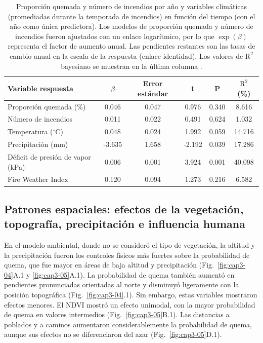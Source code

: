 \begin{table}[ht]
\centering
\caption[Tendencias temporales en incidencia del fuego y variables climáticas.]{Proporción quemada y número de incendios por año y variables climáticas (promediadas durante la temporada de incendios) en función del tiempo (con el año como única predictora). Los modelos de proporción quemada y número de incendios fueron ajustados con un enlace logarítmico, por lo que $\exp{(\beta)}$ representa el factor de aumento anual. Las pendientes restantes son las tasas de cambio anual en la escala de la respuesta (enlace identidad). Los valores de $\text{R}^2$ bayesiano se muestran en la última columna \citep{gelman_r-squared_2019}.}
\label{tab:climate-ts}
\begin{tabular}{lccccc}
\toprule
Variable respuesta & $\beta$ & Error estándar & t & P & $\text{R}^2$ (\%) \\
\midrule
Proporción quemada (\%)           & 0.046   & 0.047 & 0.976  & 0.340 & 8.616  \\
Número de incendios               & 0.011   & 0.022 & 0.491  & 0.624 & 1.032  \\
Temperatura ($^\circ$C)           & 0.048   & 0.024 & 1.992  & 0.059 & 14.716 \\
Precipitación (mm)                & -3.635  & 1.658 & -2.192 & 0.039 & 17.286 \\
Déficit de presión de vapor (kPa) & 0.006   & 0.001 & 3.924  & 0.001 & 40.098 \\
Fire Weather Index                & 0.120   & 0.094 & 1.273  & 0.216 & 6.582  \\
\bottomrule
\end{tabular}
\end{table}

\FloatBarrier

\subsection{Patrones espaciales: efectos de la vegetación, topografía, precipitación e influencia humana}

En el modelo ambiental, donde no se consideró el tipo de vegetación, la altitud y la precipitación fueron los controles físicos más fuertes sobre la probabilidad de quema, que fue mayor en áreas de baja altitud y precipitación (Fig.~\ref{fig:cap3-04}A.1 y \ref{fig:cap3-05}A.1). La probabilidad de quema también aumentó en pendientes pronunciadas orientadas al norte y disminuyó ligeramente con la posición topográfica (Fig.~\ref{fig:cap3-04}.1). Sin embargo, estas variables mostraron efectos menores. El NDVI mostró un efecto unimodal, con la mayor probabilidad de quema en valores intermedios (Fig.~\ref{fig:cap3-05}B.1). Las distancias a poblados y a caminos aumentaron considerablemente la probabilidad de quema, aunque sus efectos no se diferenciaron del azar (Fig.~\ref{fig:cap3-05}D.1).

